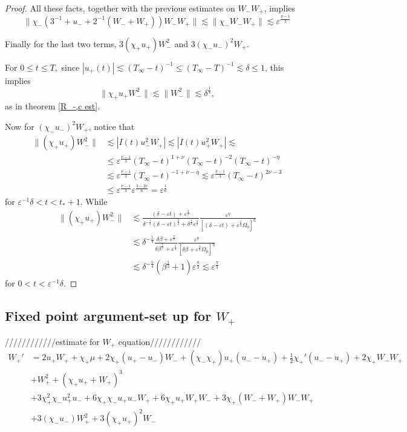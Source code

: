 \documentclass[letterpaper,11pt]{article}
\newcommand{\eps}{\varepsilon}
\newcommand{\lar}{ \lesssim }
\numberwithin{equation}{section}
\theoremstyle{plain}
\begin{document}
\begin{itemize}
\begin{enumerate}
\begin{proof}
All these facts, together with the previous estimates on $W_-W_+$, implies  
\[
\|\chi_-(3^{-1}+u_- +2^{-1}(W_-+W_+))W_-W_+\| \lar \|\chi_-W_-W_+\| \lar \eps^{\frac{\eta-1}{3}}
\]

Finally for the last two terms, $3(\chi_+u_+)W_-^2$ and $ 3(\chi_-u_-)^2W_+$.

For $0\le t \le T,$ since $|u_+(t)| \lar (T_\infty-t)^{-1} \le (T_\infty-T)^{-1} \lar \delta \le 1$, this implies
\[
\|\chi_+u_+W_-^2\| \lar \|W_-^2\| \lar \delta^{\frac{1}{4}},
\]
as in theorem \ref{R_-,c est}.


Now for $(\chi_-u_-)^2W_+$, notice that
\begin{align*}
\|(\chi_+u_+)W_-^2\| &\lar |I(t)u_-^2W_+| \lar |I(t)u_+^2W_+| \lar \\
&\le \eps^{\frac{\nu-1}{3}}(T_\infty-t)^{1+\nu}(T_\infty-t)^{-2}(T_\infty-t)^{-\eta} \\
&\lar \eps^{\frac{\nu-1}{3}}(T_\infty-t)^{-1+\nu-\eta} \lar \eps^{\frac{\nu-1}{3}}(T_\infty-t)^{2\nu-3} \\
& \le \eps^{\frac{\nu-1}{3}}\eps^{\frac{3-2\nu}{6}} = \eps^{\frac{1}{6}}
\end{align*}
for $\eps^{-1}\delta < t<t_*+1$. While
\begin{align*}
\|(\chi_+u_+)W_-^2\| & \lar \frac{(\delta-\eps t)+\eps^{\frac{2}{3}}}{\delta^{-\frac{1}{4}}(\delta-\eps t)^{\frac{3}{2}} +\delta^{\frac{1}{4}}\eps^{\frac{2}{3}}} \frac{\eps^\eta}{\left[(\delta-\eps t)+\eps^{\frac{2}{3}}\Omega_0 \right]^{\eta}}\\
& \lar \delta^{-\frac{1}{4}}\frac{\delta \beta+\eps^{\frac{2}{3}}}{\delta \beta^{\frac{3}{2}}+\eps^{\frac{2}{3}}} \frac{\eps^{\eta}}{\left[\delta\beta+\eps^{\frac{2}{3}}\Omega_0\right]^\eta}\\
&\lar \delta^{-\frac{1}{4}} (\beta^{\frac{1}{2}}+1) \eps^{\frac{\eta}{3}} \lar \eps^{\frac{\eta}{3}}
\end{align*}
for $0<t<\eps^{-1}\delta$.
\end{proof}
\end{enumerate}


\pagebreak
\subsection{Fixed point argument-set up for \texorpdfstring{$W_+$}{Wplus}}
////////////estimate for $W_+$ equation////////////
\begin{align*}
W_+'  &= 2u_+W_+ + \chi_+\mu+ 2\chi_+(u_+ -u_-)W_-+ (\chi_-\chi_+) u_+(u_- -u_+)+\frac{1}{2}\chi_+'(u_- -u_+) +2\chi_+W_-W_+\\
&+W_+^2+ (\chi_+u_+ + W_+)^3 \\
&+ 3\chi_+^2\chi_-u_+^2u_- + 6\chi_+\chi_- u_+u_- W_+ +6 \chi_+u_+W_+W_- +3\chi_+(W_-+W_+)W_-W_+\\
&+3(\chi_-u_-)W_+^2 + 3(\chi_+u_+)^2W_-
\end{align*}


\end{itemize}
\end{document}
